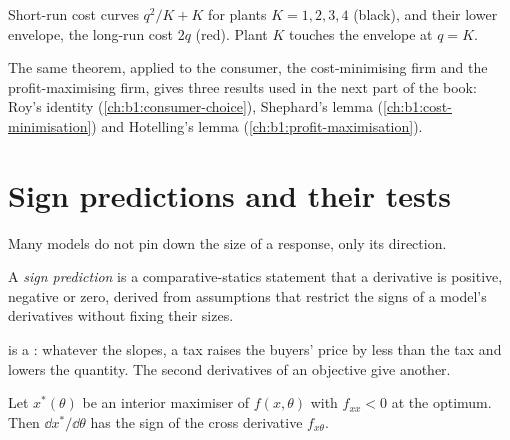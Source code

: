 \begin{omfigure}

{\small Short-run cost curves $q^2/K + K$ for plants $K = 1, 2, 3, 4$
(black), and their lower envelope, the long-run cost $2q$ (red). Plant $K$
touches the envelope at $q = K$.}
\end{omfigure}

The same theorem, applied to the consumer, the cost-minimising firm and the
profit-maximising firm, gives three results used in the next part of the
book: Roy's identity (\cref{ch:b1:consumer-choice}), Shephard's lemma
(\cref{ch:b1:cost-minimisation}) and Hotelling's lemma
(\cref{ch:b1:profit-maximisation}).

\section{Sign predictions and their tests}\label{sec:b1:comparative-statics:signs}

Many models do not pin down the size of a response, only its direction.

\begin{definition}\label{def:b1:comparative-statics:sign-prediction}
A \emph{sign prediction} is a comparative-statics statement that a
derivative is positive, negative or zero, derived from assumptions that
restrict the signs of a model's derivatives without fixing their sizes.
\end{definition}

 is a : whatever
the slopes, a tax raises the buyers' price by less than the tax and lowers
the quantity. The second derivatives of an objective give another.

\begin{proposition}\label{prop:b1:comparative-statics:monotone}
Let $x^*(\theta)$ be an interior maximiser of $f(x, \theta)$ with
$f_{xx} < 0$ at the optimum. Then $\dd x^*/\dd\theta$ has the sign of the
cross derivative $f_{x\theta}$.
\end{proposition}

